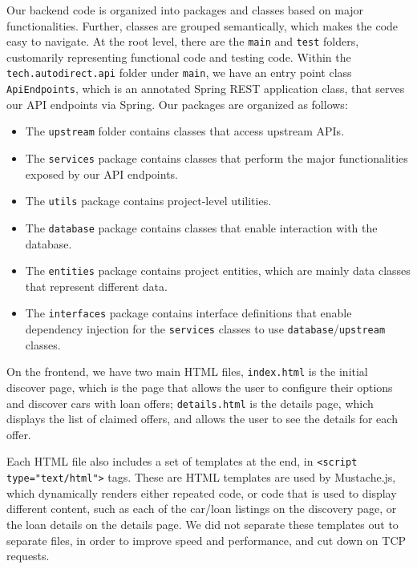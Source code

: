 \documentclass[fontsize=14pt]{article}
\def\code#1{\texttt{#1}}
\begin{document}
Our backend code is organized into packages and classes based on major functionalities. Further, classes are grouped semantically, which makes the code easy to navigate. At the root level, there are the \texttt{main} and \texttt{test} folders, customarily representing functional code and testing code. Within the \texttt{tech.autodirect.api} folder under \texttt{main}, we have an entry point class \texttt{ApiEndpoints}, which is an annotated Spring REST application class, that serves our API endpoints via Spring. Our packages are organized as follows:
\begin{itemize}
    \item The \texttt{upstream} folder contains classes that access upstream APIs.
    
    \item The \texttt{services} package contains classes that perform the major functionalities exposed by our API endpoints.
    
    \item The \texttt{utils} package contains project-level utilities.
    
    \item The \texttt{database} package contains classes that enable interaction with the database.
    
    \item The \texttt{entities} package contains project entities, which are mainly data classes that represent different data.
    
    \item The \texttt{interfaces} package contains interface definitions that enable dependency injection for the \code{services} classes to use \code{database}/\code{upstream} classes.
\end{itemize}

\noindent
On the frontend, we have two main HTML files, \code{index.html} is the initial discover page, which is the page that allows the user to configure their options and discover cars with loan offers; \code{details.html} is the details page, which displays the list of claimed offers, and allows the user to see the details for each offer.

Each HTML file also includes a set of templates at the end, in \code{<script type="text/html">} tags. These are HTML templates are used by Mustache.js, which dynamically renders either repeated code, or code that is used to display different content, such as each of the car/loan listings on the discovery page, or the loan details on the details page. We did not separate these templates out to separate files, in order to improve speed and performance, and cut down on TCP requests.
\end{document}
